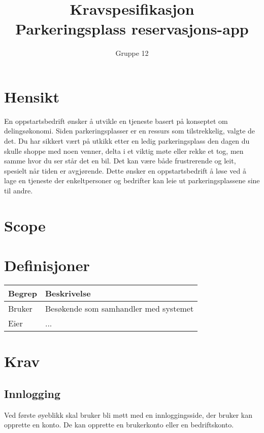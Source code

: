 \documentclass[12pt]{article}
\begin{document}
\title{%
    Kravspesifikasjon\\
    \large Parkeringsplass reservasjons-app }
\author{Gruppe 12}
\date{}
\maketitle

\newpage

\tableofcontents

\newpage

\section{Hensikt}
En oppstartsbedrift ønsker å utvikle en tjeneste basert på konseptet om delingsøkonomi. Siden parkeringsplasser er en ressurs som tilstrekkelig, valgte de det. Du har sikkert vært på utkikk etter en ledig parkeringsplass den dagen du skulle shoppe med noen venner, delta i et viktig møte eller rekke et tog, men samme hvor du ser står det en bil. Det kan være både frustrerende og leit, spesielt når tiden er avgjørende. Dette ønsker en oppstartsbedrift å løse ved å lage en tjeneste der enkeltpersoner og bedrifter kan leie ut parkeringsplassene sine til andre.

\section{Scope}

\section{Definisjoner}

\begin{center}
    \begin{tabular}{|p{4cm}|p{12cm}| } 
        \hline
        \bf Begrep & \bf Beskrivelse \\
        \hline
        Bruker & Besøkende som samhandler med systemet \\
        \hline
        Eier & ... \\
        \hline
    \end{tabular}
\end{center}

\section{Krav}

\subsection{Innlogging}
Ved første øyeblikk skal bruker bli møtt med en innloggingsside, der bruker kan opprette en konto. De kan opprette en brukerkonto eller en bedriftskonto.
\end{document}

